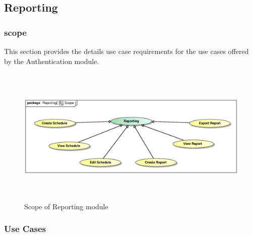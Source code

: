 \documentclass[12pt]{article}
\begin{document}
\subsection{Reporting}

\subsubsection{scope}
\par{This section provides the details use case requirements for the use cases offered by the Authentication
module.}

\begin{figure}[h]
\includegraphics[height=250px, width=500px]{epsImages/Reporting/ReportScope.eps}
\caption{Scope of Reporting module}
\end{figure}


\subsubsection{Use Cases}
\end{document}
